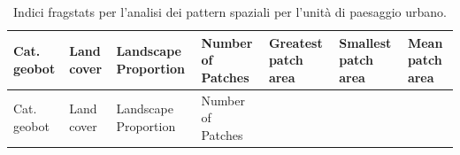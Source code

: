 \documentclass[
]{book}
\begin{document}
\begin{longtable}[]{@{}
  >{\raggedright\arraybackslash}p{}
  >{\raggedright\arraybackslash}p{}
  >{\centering\arraybackslash}p{}
  >{\raggedright\arraybackslash}p{}
  >{\raggedright\arraybackslash}p{}
  >{\raggedright\arraybackslash}p{}
  >{\raggedright\arraybackslash}p{}@{}}
\caption{\label{tab:fragUrbano} Indici fragstats per l'analisi dei pattern spaziali per l'unità di paesaggio urbano.}\tabularnewline
\toprule\noalign{}
\begin{minipage}[b]{\linewidth}\raggedright
Cat. geobot
\end{minipage} & \begin{minipage}[b]{\linewidth}\raggedright
Land cover
\end{minipage} & \begin{minipage}[b]{\linewidth}\centering
Landscape Proportion
\end{minipage} & \begin{minipage}[b]{\linewidth}\raggedright
Number of Patches
\end{minipage} & \begin{minipage}[b]{\linewidth}\raggedright
Greatest patch area
\end{minipage} & \begin{minipage}[b]{\linewidth}\raggedright
Smallest patch area
\end{minipage} & \begin{minipage}[b]{\linewidth}\raggedright
Mean patch area
\end{minipage} \\
\midrule\noalign{}
\endfirsthead
\toprule\noalign{}
\begin{minipage}[b]{\linewidth}\raggedright
Cat. geobot
\end{minipage} & \begin{minipage}[b]{\linewidth}\raggedright
Land cover
\end{minipage} & \begin{minipage}[b]{\linewidth}\centering
Landscape Proportion
\end{minipage} & \begin{minipage}[b]{\linewidth}\raggedright
Number of Patches
\end{minipage} & \begin{minipage}[b]{\linewidth}\raggedright

\end{minipage}
\end{longtable}
\end{document}
